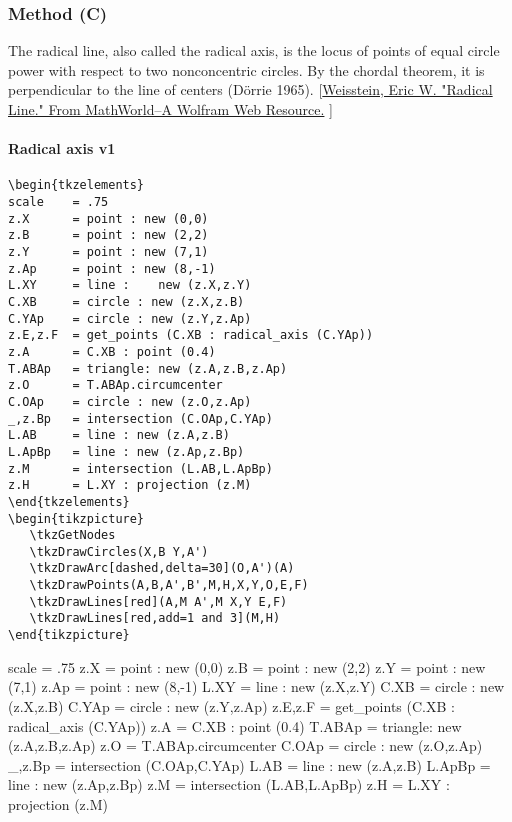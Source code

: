 
\subsubsection{Method (C)} %
\label{ssub:method_imeth_circle_radical__axis_c}

The radical line, also called the radical axis, is the locus of points of equal circle power with respect to two nonconcentric circles. By the chordal theorem, it is perpendicular to the line of centers (Dörrie 1965). [\href{https://mathworld.wolfram.com/RadicalLine.html}{Weisstein, Eric W. "Radical Line." From MathWorld--A Wolfram Web Resource.} ]

\vspace{6pt}
\paragraph{Radical axis v1} %
\label{par:radical_axis_v1}

\begin{Verbatim}
\begin{tkzelements}
scale    = .75
z.X      = point : new (0,0)
z.B      = point : new (2,2)
z.Y      = point : new (7,1)
z.Ap     = point : new (8,-1)
L.XY     = line :    new (z.X,z.Y)
C.XB     = circle : new (z.X,z.B)
C.YAp    = circle : new (z.Y,z.Ap)
z.E,z.F  = get_points (C.XB : radical_axis (C.YAp))
z.A      = C.XB : point (0.4)
T.ABAp   = triangle: new (z.A,z.B,z.Ap)
z.O      = T.ABAp.circumcenter
C.OAp    = circle : new (z.O,z.Ap)
_,z.Bp   = intersection (C.OAp,C.YAp)
L.AB     = line : new (z.A,z.B)
L.ApBp   = line : new (z.Ap,z.Bp)
z.M      = intersection (L.AB,L.ApBp)
z.H      = L.XY : projection (z.M)
\end{tkzelements}
\begin{tikzpicture}
   \tkzGetNodes
   \tkzDrawCircles(X,B Y,A')
   \tkzDrawArc[dashed,delta=30](O,A')(A)
   \tkzDrawPoints(A,B,A',B',M,H,X,Y,O,E,F)
   \tkzDrawLines[red](A,M A',M X,Y E,F)
   \tkzDrawLines[red,add=1 and 3](M,H)
\end{tikzpicture}
\end{Verbatim}

\begin{tkzelements}
scale    = .75
z.X      = point : new (0,0)
z.B      = point : new (2,2)
z.Y      = point : new (7,1)
z.Ap     = point : new (8,-1)
L.XY     = line :    new (z.X,z.Y)
C.XB     = circle : new (z.X,z.B)
C.YAp    = circle : new (z.Y,z.Ap)
z.E,z.F  = get_points (C.XB : radical_axis (C.YAp))
z.A      = C.XB : point (0.4)
T.ABAp   = triangle: new (z.A,z.B,z.Ap)
z.O      = T.ABAp.circumcenter
C.OAp    = circle : new (z.O,z.Ap)
_,z.Bp   = intersection (C.OAp,C.YAp)
L.AB     = line : new (z.A,z.B)
L.ApBp   = line : new (z.Ap,z.Bp)
z.M      = intersection (L.AB,L.ApBp)
z.H      = L.XY : projection (z.M)
\end{tkzelements}


